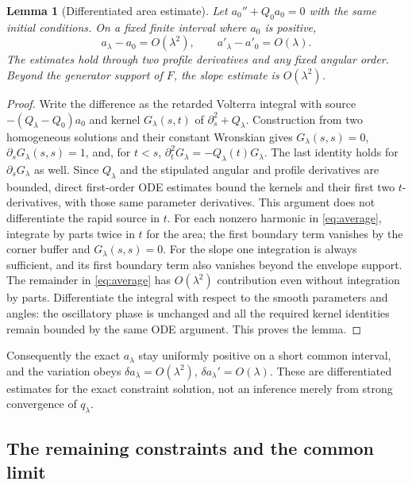 \documentclass[11pt]{article}
\newtheorem{lemma}[theorem]{Lemma}
\begin{document}
\begin{lemma}[Differentiated area estimate]\label{lem:area}
Let \(a_0''+Q_0a_0=0\) with the same initial conditions.
On a fixed finite interval where \(a_0\) is positive,
\begin{equation}
   a_\lambda-a_0=O(\lambda^2),\qquad
   a'_\lambda-a'_0=O(\lambda).
 \label{eq:area}
\end{equation}
The estimates hold through two profile derivatives and
any fixed angular order. Beyond the generator support of
\(F\), the slope estimate is \(O(\lambda^2)\).
\end{lemma}

\begin{proof}
Write the difference as the retarded Volterra integral
with source \(-(Q_\lambda-Q_0)a_0\) and kernel
\(G_\lambda(s,t)\) of \(\partial_s^2+Q_\lambda\).
Construction from two homogeneous solutions and
their constant Wronskian gives
\(G_\lambda(s,s)=0\), \(\partial_sG_\lambda(s,s)=1\),
and, for \(t<s\),
\(\partial_t^2G_\lambda=-Q_\lambda(t)G_\lambda\).
The last identity holds for \(\partial_sG_\lambda\)
as well. Since \(Q_\lambda\) and the stipulated
angular and profile derivatives are bounded, direct
first-order ODE estimates bound the kernels and
their first two \(t\)-derivatives, with those same
parameter derivatives. This argument does not
differentiate the rapid source in \(t\).
For each nonzero harmonic in \eqref{eq:average},
integrate by parts twice in \(t\) for the area;
the first boundary term vanishes by the corner
buffer and \(G_\lambda(s,s)=0\). For the slope one
integration is always sufficient, and its first
boundary term also vanishes beyond the envelope
support. The remainder in \eqref{eq:average}
has \(O(\lambda^2)\) contribution even without
integration by parts. Differentiate the integral
with respect to the smooth parameters and angles:
the oscillatory phase is unchanged and all the
required kernel identities remain bounded by the
same ODE argument. This proves the lemma.
\end{proof}

Consequently the exact \(a_\lambda\) stay uniformly
positive on a short common interval, and the variation
obeys \(\delta a_\lambda=O(\lambda^2)\),
\(\delta a_\lambda'=O(\lambda)\).
These are differentiated estimates for the exact
constraint solution, not an inference merely from
strong convergence of \(q_\lambda\).

\subsection{The remaining constraints and the common limit}
\end{document}
